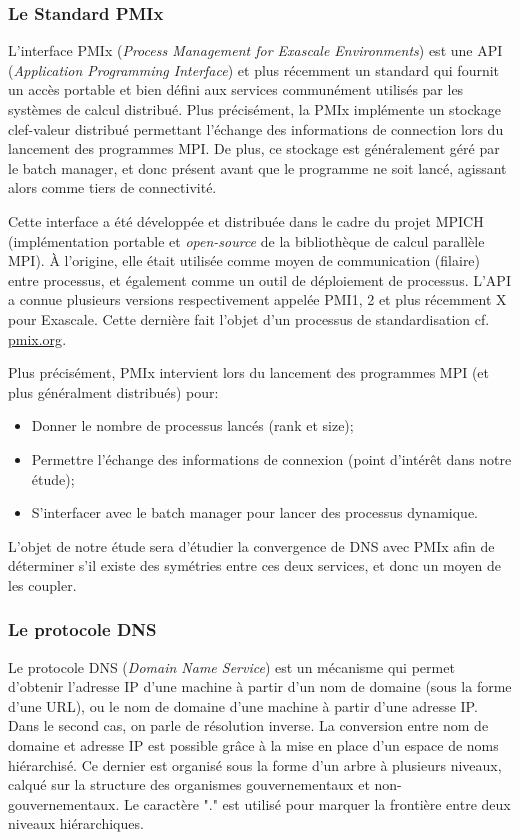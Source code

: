 \documentclass[12pt,a4paper]{article}
\begin{document}
\subsubsection{Le Standard PMIx}

\quad L’interface PMIx (\textit{Process Management for Exascale Environments}) est une API (\textit{Application Programming Interface}) et plus récemment un standard qui fournit un accès portable et bien défini aux services communément utilisés par les systèmes de calcul distribué. Plus précisément, la PMIx implémente un stockage clef-valeur distribué permettant l'échange des informations de connection lors du lancement des programmes MPI. De plus, ce stockage est généralement géré par le batch manager, et donc présent avant que le programme ne soit lancé, agissant alors comme tiers de connectivité.

\quad Cette interface a été développée et distribuée dans le cadre du projet MPICH (implémentation portable et \textit{open-source} de la bibliothèque de calcul parallèle MPI). À l’origine, elle était utilisée comme moyen de communication (filaire) entre processus, et également comme un outil de déploiement de processus. L’API  a connue plusieurs versions respectivement appelée PMI1, 2 et plus récemment X pour Exascale. Cette dernière fait l'objet d'un processus de standardisation cf. \url{pmix.org}.

\quad Plus précisément, PMIx intervient lors du lancement des programmes MPI (et plus généralment distribués) pour:
\begin{itemize}
    \item Donner le nombre de processus lancés (rank et size);
    \item Permettre l'échange des informations de connexion (point d'intérêt dans notre étude);
    \item S'interfacer avec le batch manager pour lancer des processus dynamique.
\end{itemize}

L'objet de notre étude sera d'étudier la convergence de DNS avec PMIx afin de déterminer s'il existe des symétries entre ces deux services, et donc un moyen de les coupler.

\subsubsection{Le protocole DNS}

\quad Le protocole DNS (\textit{Domain Name Service}) est un mécanisme qui permet d’obtenir l’adresse IP d’une machine à partir d’un nom de domaine (sous la forme d’une URL), ou le nom de domaine d’une machine à partir d’une adresse IP. Dans le second cas, on parle de résolution inverse. La conversion entre nom de domaine et adresse IP est possible grâce à la mise en place d’un espace de noms hiérarchisé. Ce dernier est organisé sous la forme d'un arbre à plusieurs niveaux, calqué sur la structure des organismes gouvernementaux et non-gouvernementaux. Le caractère "." est utilisé pour marquer la frontière entre deux niveaux hiérarchiques.
\end{document}
